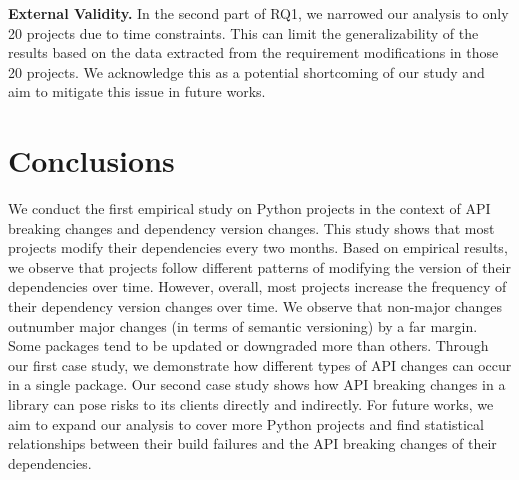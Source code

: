 \documentclass[conference]{IEEEtran}
\begin{document}
\textbf{External Validity.} In the second part of RQ1, we narrowed our analysis to only 20 projects due to time constraints. This can limit the generalizability of the results based on the data extracted from the requirement modifications in those 20 projects. We acknowledge this as a potential shortcoming of our study and aim to mitigate this issue in future works.


\section{Conclusions}
We conduct the first empirical study on Python projects in the context of API breaking changes and dependency version changes. This study shows that most projects modify their dependencies every two months. Based on empirical results, we observe that projects follow different patterns of modifying the version of their dependencies over time. However, overall, most projects increase the frequency of their dependency version changes over time. We observe that non-major changes outnumber major changes (in terms of semantic versioning) by a far margin. Some packages tend to be updated or downgraded more than others. Through our first case study, we demonstrate how different types of API changes can occur in a single package. Our second case study shows how API breaking changes in a library can pose risks to its clients directly and indirectly. For future works, we aim to expand our analysis to cover more Python projects and find statistical relationships between their build failures and the API breaking changes of their dependencies. 
  



\end{document}
